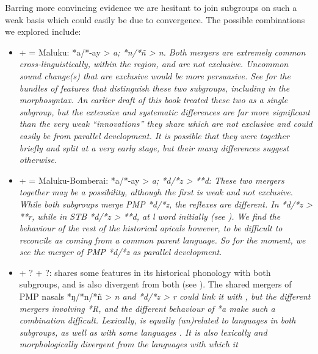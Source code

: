 Barring more convincing evidence we are hesitant to join subgroups
on such a weak basis which could easily be due to convergence.
The possible combinations we explored include:

\begin{itemize}
	\item	{} +  =  Maluku: *a/*-ay
				> \it{a}; *n/*ñ > \it{n}.
				Both mergers are extremely common cross-linguistically,
				within the region, and are not exclusive.
				Uncommon sound change(s) that are exclusive would be more persuasive.
				See  for the bundles of features that distinguish
				these two subgroups, including in the morphosyntax.
				An earlier draft of this book treated these two as a single subgroup,
				but the extensive and systematic differences are far more significant
				than the very weak “innovations” they share which are not exclusive
				and could easily be from parallel development.
				It is possible that they were together briefly
				and split at a very early stage,
				but their many differences suggest otherwise.
	\item	{} +  = Maluku-Bomberai:
				*a/\mbox{*-ay} > \it{a}; *d/*z > **d: These two mergers together may
				be a possibility, although the first is weak and not exclusive.
				While both subgroups merge PMP *d/*z,
				the reflexes are different.
				In  *d/*z > **r,
				while in STB *d/*z > **d,
				at l word initially (see ).
				We find the behaviour of the rest of the historical apicals however,
				to be difficult to reconcile as coming from a common parent language.
				So for the moment,
				we see the merger of PMP *d/*z as parallel development.
	\item	{} + ?  + ?:
				 shares some features in its historical phonology with both
				subgroups, and is also divergent from both (see ).
				The shared mergers of PMP nasals *ŋ/*n/*ñ > \it{n}
				and *d/*z > \it{r} could link it with ,
				but the different mergers involving *R,
				and the different behaviour of *a make such a combination difficult.
				Lexically,  is equally (un)related to languages in both
				subgroups, as well as with some  languages \citep{Hughes1987,LoskiLoski1989}.
				It is also lexically
				and morphologically divergent from the languages with which it

\end{itemize}
